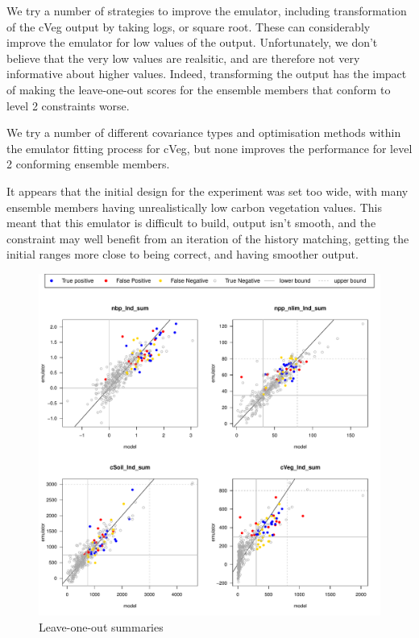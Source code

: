 \documentclass[gmd, manuscript]{copernicus}
\begin{document}
We try a number of strategies to improve the emulator, including transformation of the cVeg output by taking logs, or square root. These can considerably improve the emulator for low values of the output. Unfortunately, we don't believe that the very low values are realsitic, and are therefore not very informative about higher values. Indeed, transforming the output has the impact of making the leave-one-out scores for the ensemble members that conform to level 2 constraints worse.

We try a number of different covariance types and optimisation methods within the emulator fitting process for cVeg, but none improves the performance for level 2 conforming ensemble members.

It appears that the initial design for the experiment was set too wide, with many ensemble members having unrealistically low carbon vegetation values. This meant that this emulator is difficult to build, output isn't smooth, and the constraint may well benefit from an iteration of the history matching, getting the initial ranges more close to being correct, and having smoother output.



\begin{figure}[t]
\includegraphics[width=12cm]{./graphics/Y_const_loo.pdf}
\caption{Leave-one-out summaries }
\label{fig:Y_const_loo}
\end{figure}
\end{document}
